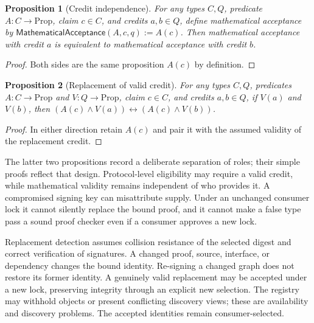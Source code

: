 \documentclass[11pt]{article}
\newtheorem{proposition}{Proposition}
\begin{document}
\begin{proposition}[Credit independence]
For any types $C,Q$, predicate $A:C\to\mathrm{Prop}$, claim $c\in C$, and
credits $a,b\in Q$, define mathematical acceptance by
$\mathsf{MathematicalAcceptance}(A,c,q):=A(c)$.
Then mathematical acceptance with credit $a$ is equivalent to mathematical
acceptance with credit $b$.
\end{proposition}

\begin{proof}
Both sides are the same proposition $A(c)$ by definition.
\end{proof}

\begin{proposition}[Replacement of valid credit]
For any types $C,Q$, predicates $A:C\to\mathrm{Prop}$ and
$V:Q\to\mathrm{Prop}$, claim $c\in C$, and credits $a,b\in Q$,
if $V(a)$ and $V(b)$, then
$(A(c)\land V(a))\leftrightarrow(A(c)\land V(b))$.
\end{proposition}

\begin{proof}
In either direction retain $A(c)$ and pair it with the assumed validity of the
replacement credit.
\end{proof}

The latter two propositions record a deliberate separation of roles; their
simple proofs reflect that design. Protocol-level eligibility may require a
valid credit, while mathematical validity remains independent of who provides
it. A compromised signing key can misattribute supply. Under an unchanged
consumer lock it cannot silently replace the bound proof, and it cannot make a
false type pass a sound proof checker even if a consumer approves a new lock.

Replacement detection assumes collision resistance of the selected digest and
correct verification of signatures. A changed proof, source, interface, or
dependency changes the bound identity. Re-signing a changed graph does not
restore its former identity. A genuinely valid replacement may be accepted
under a new lock, preserving integrity through an explicit new selection.
The registry may withhold objects or present conflicting discovery views; these
are availability and discovery problems. The accepted identities remain
consumer-selected.
\end{document}
